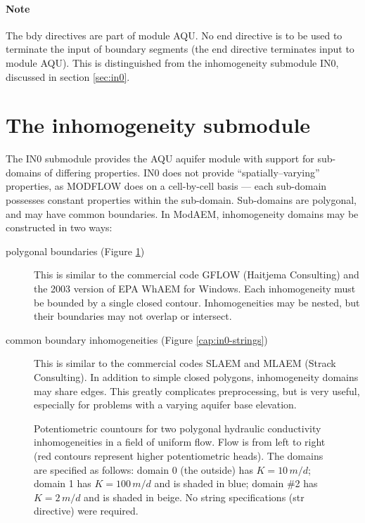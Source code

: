 \paragraph{Note}
The \textsf{bdy} directives are part of module \textsf{AQU}. No \textsf{end} directive is to be used to terminate the input of boundary segments (the \textsf{end} directive terminates input to module \textsf{AQU}). This is distinguished from the inhomogeneity submodule \textsf{IN0}, discussed in section \ref{sec:in0}.

\section{The inhomogeneity submodule\label{sec:in0}}
The \textsf{IN0} submodule provides the \textsf{AQU} aquifer module with support for sub-domains of differing properties. IN0 does not provide ``spatially--varying'' properties, as MODFLOW does on a cell-by-cell basis --- each sub-domain possesses constant properties within the sub-domain. Sub-domains are polygonal, and may have common boundaries. In ModAEM, inhomogeneity domains may be constructed in two ways:
\begin{description}
\item [{polygonal boundaries (Figure \ref{cap:in0-polys})}] This is similar to the commercial code GFLOW (Haitjema Consulting) and the 2003 version of EPA WhAEM for Windows. Each inhomogeneity must be bounded by a single closed contour. Inhomogeneities may be nested, but their boundaries may not overlap or intersect.
\item [{common boundary inhomogeneities (Figure \ref{cap:in0-strings})}] This is similar to the commercial codes SLAEM and MLAEM (Strack Consulting). In addition to simple closed polygons, inhomogeneity domains may share edges. This greatly complicates preprocessing, but is very useful, especially for problems with a varying aquifer base elevation.
\end{description}
\begin{figure}
	\begin{centering}
	\end{centering}
	\caption{\label{cap:in0-polys}Potentiometric countours for two polygonal hydraulic conductivity inhomogeneities in a field of uniform flow. Flow is from left to right (red contours represent higher potentiometric heads). The domains are specified as follows: domain 0 (the outside) has $K=10\, m/d$; domain 1 has $K=100\, m/d$ and is shaded in blue; domain \#2 has $K=2\, m/d$ and is shaded in beige. No string specifications (\textsf{str} directive) were required.}
\end{figure}
